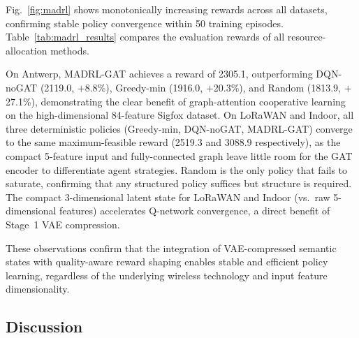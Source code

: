 \documentclass[conference]{IEEEtran}
\begin{document}
Fig.~\ref{fig:madrl} shows monotonically increasing rewards across all
datasets, confirming stable policy convergence within 50 training
episodes. Table~\ref{tab:madrl_results} compares the evaluation rewards
of all resource-allocation methods.

\begin{table}[t]
\centering
\caption{Evaluation reward (mean over 20 episodes).
$\dagger$~Reward ceiling reached by all deterministic policies.}
\label{tab:madrl_results}
\renewcommand{\arraystretch}{1.1}
\end{table}

On Antwerp, MADRL-GAT achieves a reward of 2305.1, outperforming
DQN-noGAT (2119.0, $+$8.8\%), Greedy-min (1916.0, $+$20.3\%), and
Random (1813.9, $+$27.1\%), demonstrating the clear benefit of
graph-attention cooperative learning on the high-dimensional
84-feature Sigfox dataset.
On LoRaWAN and Indoor, all three deterministic policies (Greedy-min,
DQN-noGAT, MADRL-GAT) converge to the same maximum-feasible reward
(2519.3 and 3088.9 respectively), as the compact 5-feature input and
fully-connected graph leave little room for the GAT encoder to
differentiate agent strategies. Random is the only policy that
fails to saturate, confirming that any structured policy suffices
but structure is required.
The compact 3-dimensional latent state for LoRaWAN and Indoor
(vs.\ raw 5-dimensional features) accelerates Q-network convergence,
a direct benefit of Stage~1 VAE compression.

These observations confirm that the integration of VAE-compressed
semantic states with quality-aware reward shaping enables stable and
efficient policy learning, regardless of the underlying wireless
technology and input feature dimensionality.

\subsection{Discussion}
\end{document}
